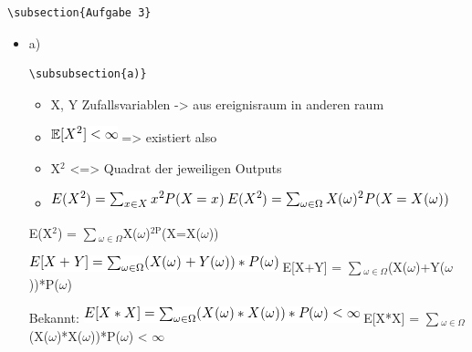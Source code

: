 \documentclass[11pt]{article}
\begin{document}
\begin{verbatim}
\subsection{Aufgabe 3}
\end{verbatim}
\begin{itemize}

\item a)\\
\label{sec-3-8-4-1}%
\begin{verbatim}
\subsubsection{a)}
\end{verbatim}

\begin{itemize}
\item X, Y Zufallsvariablen -> aus ereignisraum in anderen raum
\item \includegraphics[width=.9\linewidth]{201212ad-1854041184ReQ.png} => existiert also
\item X$^2$ <=> Quadrat der jeweiligen Outputs
\item \includegraphics[width=.9\linewidth]{201212ad-21415714976zNO.png}
 \includegraphics[width=.9\linewidth]{201212ad-21480714976AYU.png}
\end{itemize}
E(X$^2$) = $\sum$$_{\omega \in \Omega}$X($\omega$)$^{\mathrm{2P}}$(X=X($\omega$))

 \includegraphics[width=.9\linewidth]{201212ad-05550220660LHc.png}
E[X+Y] = $\sum$$_{\omega \in \Omega}$(X($\omega$)+Y($\omega$))*P($\omega$)

Bekannt:
 \includegraphics[width=.9\linewidth]{201212ad-05585120660YRi.png}
E[X*X] = $\sum$$_{\omega \in \Omega}$(X($\omega$)*X($\omega$))*P($\omega$) < $\infty$



\end{itemize}
\end{document}
